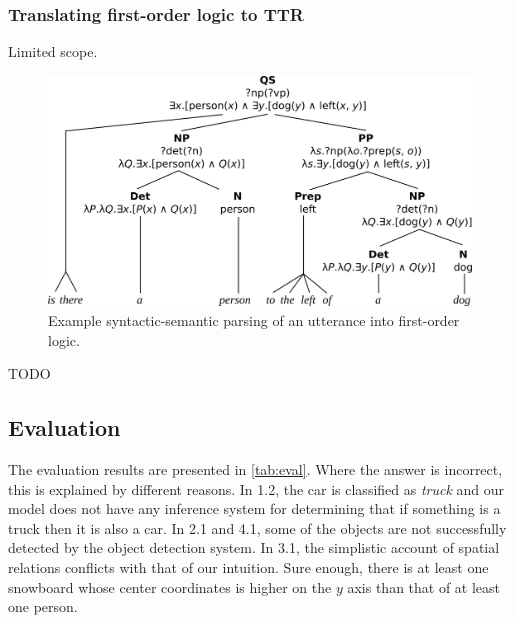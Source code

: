 \subsubsection{Translating first-order logic to TTR}

Limited scope.

\begin{figure}[h]
\label{fig:tree}
\includegraphics[width=\textwidth]{tree}
\centering
\caption{Example syntactic-semantic parsing of an utterance into first-order logic.}
\end{figure}

TODO



\subsection{Evaluation}

The evaluation results are presented in \autoref{tab:eval}.
Where the answer is incorrect, this is explained by different reasons.
In 1.2, the car is classified as \textit{truck} and our model does not have any inference system for determining that if something is a truck then it is also a car.
In 2.1 and 4.1, some of the objects are not successfully detected by the object detection system.
In 3.1, the simplistic account of spatial relations conflicts with that of our intuition.
Sure enough, there is at least one snowboard whose center coordinates is higher on the $y$ axis than that of at least one person.

